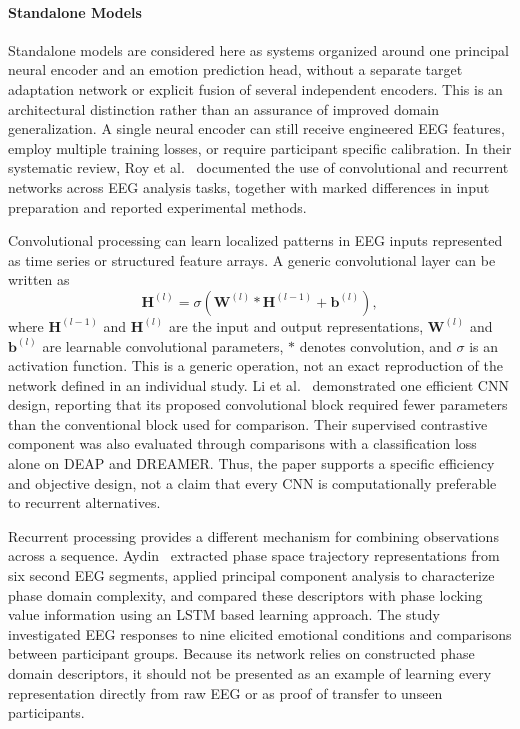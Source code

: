 \documentclass[ASNA,twocolumn]{USG}
\begin{document}
\paragraph{Standalone Models}
\label{sec:standalone_models}

Standalone models are considered here as systems organized around one principal neural encoder and an emotion prediction head, without a separate target adaptation network or explicit fusion of several independent encoders. This is an architectural distinction rather than an assurance of improved domain generalization. A single neural encoder can still receive engineered EEG features, employ multiple training losses, or require participant specific calibration. In their systematic review, Roy et al.~\cite{roy2019deep} documented the use of convolutional and recurrent networks across EEG analysis tasks, together with marked differences in input preparation and reported experimental methods.

Convolutional processing can learn localized patterns in EEG inputs represented as time series or structured feature arrays. A generic convolutional layer can be written as
\begin{equation}
\mathbf{H}^{(l)}=\sigma\!\left(
\mathbf{W}^{(l)}*\mathbf{H}^{(l-1)}
+\mathbf{b}^{(l)}
\right),
\label{eq:deep_standalone_convolution}
\end{equation}
where $\mathbf{H}^{(l-1)}$ and $\mathbf{H}^{(l)}$ are the input and output representations, $\mathbf{W}^{(l)}$ and $\mathbf{b}^{(l)}$ are learnable convolutional parameters, $*$ denotes convolution, and $\sigma$ is an activation function. This is a generic operation, not an exact reproduction of the network defined in an individual study. Li et al.~\cite{li2022eeg} demonstrated one efficient CNN design, reporting that its proposed convolutional block required fewer parameters than the conventional block used for comparison. Their supervised contrastive component was also evaluated through comparisons with a classification loss alone on DEAP and DREAMER. Thus, the paper supports a specific efficiency and objective design, not a claim that every CNN is computationally preferable to recurrent alternatives.

Recurrent processing provides a different mechanism for combining observations across a sequence. Aydin~\cite{aydin2019deep} extracted phase space trajectory representations from six second EEG segments, applied principal component analysis to characterize phase domain complexity, and compared these descriptors with phase locking value information using an LSTM based learning approach. The study investigated EEG responses to nine elicited emotional conditions and comparisons between participant groups. Because its network relies on constructed phase domain descriptors, it should not be presented as an example of learning every representation directly from raw EEG or as proof of transfer to unseen participants.
\end{document}
